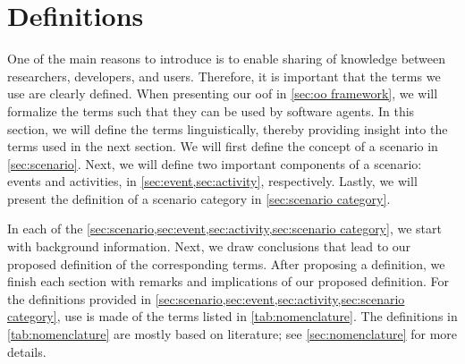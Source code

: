 \section{Definitions}
\label{sec:definitions}

One of the main reasons to introduce \cstartb {} \cendb is to enable sharing of knowledge between researchers, developers, and users. 
Therefore, it is important that the terms we use are clearly defined. 
When presenting our \cstartb \ac{oof} \cendb in \cref{sec:oo framework}, we will formalize the terms such that they can be used by software agents.
In this section, we will define the terms linguistically, thereby providing insight into the terms used in the next section.
We will first define the concept of a scenario in \cref{sec:scenario}. 
Next, we will define two important components of a scenario: events and activities, in \cref{sec:event,sec:activity}, respectively. 
Lastly, we will present the definition of a scenario category in \cref{sec:scenario category}.

In each of the \cref{sec:scenario,sec:event,sec:activity,sec:scenario category}, we start with background information. Next, we draw conclusions that lead to our proposed definition of the corresponding terms. After proposing a definition, we finish each section with remarks and implications of our proposed definition.
\cstartc For the definitions provided in \cref{sec:scenario,sec:event,sec:activity,sec:scenario category}, use is made of the terms listed in \cref{tab:nomenclature}. The definitions in \cref{tab:nomenclature} are mostly based on literature; see \cref{sec:nomenclature} for more details. \cendc


